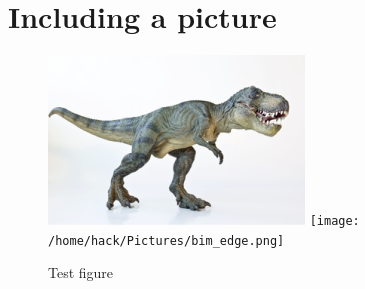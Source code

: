 \documentclass[a5paper]{article}
\begin{document}
\section{Including a picture}
\blindtext
\begin{figure}
  \centering
  \includegraphics{dinosaur}
  \texttt{[image: /home/hack/Pictures/bim\_edge.png]}
  \caption{Test figure}
\end{figure}
\blindtext
\end{document}

